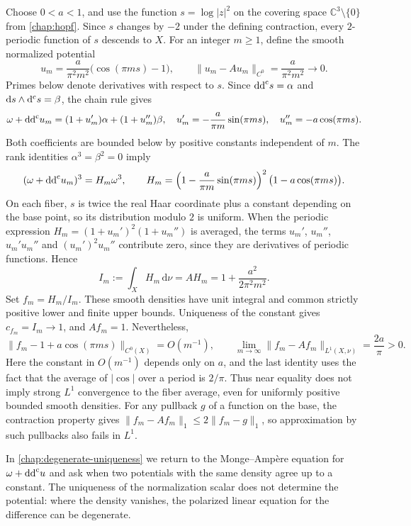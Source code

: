 \begin{example}\label{ex:hopf-oscillating-near-minimizers}
\enlargethispage{2\baselineskip}
Choose $0<a<1$, and use the function $s=\log|z|^2$ on the covering space $\mathbb C^3\setminus\{0\}$ from \cref{chap:hopf}. Since $s$ changes by $-2$ under the defining contraction, every $2$-periodic function of $s$ descends to $X$. For an integer $m\geq1$, define the smooth normalized potential
\[
 u_m=\frac{a}{\pi^2m^2}\bigl(\cos(\pi m s)-1\bigr),
 \qquad \|u_m-Au_m\|_{C^0}=\frac{a}{\pi^2m^2}\longrightarrow0.
\]
Primes below denote derivatives with respect to $s$. Since $\mathrm{dd}^{\mathrm{c}} s=\alpha$ and $\mathrm{d}s\wedge\mathrm d^{\mathrm c} s=\beta$, the chain rule gives
\[
 \omega+\mathrm{dd}^{\mathrm{c}} u_m=(1+u_m')\alpha+(1+u_m'')\beta,
 \quad u_m'=-\frac{a}{\pi m}\sin(\pi m s),\quad
 u_m''=-a\cos(\pi m s).
\]
Both coefficients are bounded below by positive constants independent of $m$. The rank identities $\alpha^3=\beta^2=0$ imply
\[
 (\omega+\mathrm{dd}^{\mathrm{c}} u_m)^3=H_m\omega^3,\qquad
 H_m=\left(1-\frac{a}{\pi m}\sin(\pi m s)\right)^2
          \bigl(1-a\cos(\pi m s)\bigr).
\]
On each fiber, $s$ is twice the real Haar coordinate plus a constant depending on the base point, so its distribution modulo $2$ is uniform. When the periodic expression $H_m=(1+u_m')^2(1+u_m'')$ is averaged, the terms $u_m'$, $u_m''$, $u_m'u_m''$ and $(u_m')^2u_m''$ contribute zero, since they are derivatives of periodic functions. Hence
\[
 I_m:=\int_XH_m\,\mathrm{d}\nu=AH_m
      =1+\frac{a^2}{2\pi^2m^2}.
\]
Set $f_m=H_m/I_m$. These smooth densities have unit integral and common strictly positive lower and finite upper bounds. Uniqueness of the constant gives $c_{f_m}=I_m\to1$, and $Af_m=1$. Nevertheless,
\[
 \|f_m-1+a\cos(\pi m s)\|_{C^0(X)}=O(m^{-1}),
 \qquad
 \lim_{m\to\infty}\|f_m-Af_m\|_{L^1(X,\nu)}=\frac{2a}{\pi}>0.
\]
Here the constant in $O(m^{-1})$ depends only on $a$, and the last identity uses the fact that the average of $|\cos|$ over a period is $2/\pi$. Thus near equality does not imply strong $L^1$ convergence to the fiber average, even for uniformly positive bounded smooth densities. For any pullback $g$ of a function on the base, the contraction property gives $\|f_m-Af_m\|_1\leq2\|f_m-g\|_1$, so approximation by such pullbacks also fails in $L^1$.
\end{example}

In \cref{chap:degenerate-uniqueness} we return to the Monge--Amp\`ere equation for $\omega+\mathrm{dd}^{\mathrm{c}} u$ and ask when two potentials with the same density agree up to a constant. The uniqueness of the normalization scalar does not determine the potential: where the density vanishes, the polarized linear equation for the difference can be degenerate.

